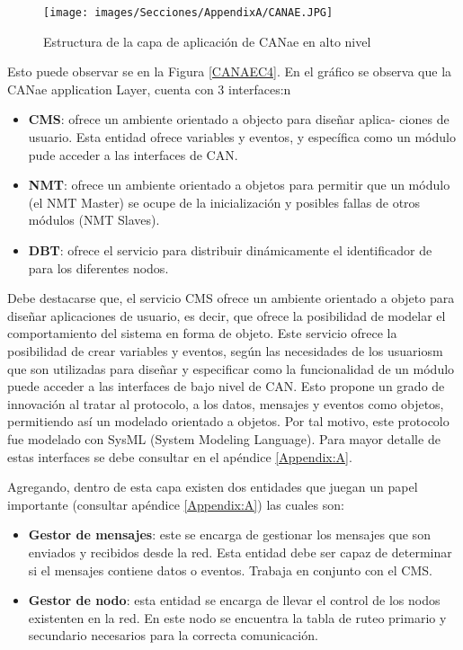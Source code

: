 \begin{figure}[h!]
 \centering
 \texttt{[image: images/Secciones/AppendixA/CANAE.JPG]}
  \caption{Estructura de la capa de aplicación de CANae en alto nivel}
\label{fig:CANAEC4}
\end{figure}

Esto puede observar se en la Figura \ref{CANAEC4}. En el gráfico se observa que
la CANae application Layer, cuenta con 3 interfaces:n
\begin{itemize}
\item \textbf{CMS}: ofrece un ambiente orientado a objecto para diseñar aplica-
ciones de usuario. Esta entidad ofrece variables y eventos, y específica como un módulo pude acceder a
las interfaces de CAN.
\item \textbf{NMT}: ofrece un ambiente orientado a objetos para permitir que un módulo (el
NMT Master) se ocupe de la inicialización y posibles fallas de otros módulos (NMT Slaves).
\item \textbf{DBT}: ofrece el servicio para distribuir dinámicamente el identificador de para los diferentes nodos.
\end{itemize}
Debe destacarse que, el servicio CMS ofrece un ambiente orientado a objeto  para diseñar
aplicaciones de usuario, es decir, que ofrece la posibilidad de modelar el
comportamiento del sistema en forma de objeto. Este servicio ofrece la posibilidad
de crear variables y eventos, según las necesidades de los usuariosm que son
utilizadas para diseñar y especificar como la funcionalidad de un módulo puede
acceder a las interfaces de bajo nivel de CAN. Esto propone un grado de innovación
al tratar al protocolo, a los datos, mensajes y eventos como objetos, permitiendo así
un modelado orientado a objetos. Por tal motivo, este protocolo fue modelado
con SysML (System Modeling Language).
Para mayor detalle de estas interfaces se debe consultar en el apéndice \ref{Appendix:A}.

Agregando, dentro de esta capa existen dos entidades que juegan un papel importante
(consultar apéndice \ref{Appendix:A}) las cuales son:
\begin{itemize}
\item \textbf{Gestor de mensajes}: este se encarga de gestionar los mensajes que son enviados y recibidos desde la red.
Esta entidad debe ser capaz de determinar si el mensajes contiene datos o eventos. Trabaja en conjunto
con el CMS.
\item \textbf{Gestor de nodo}: esta entidad se encarga de llevar el control de los nodos existenten en la red. En este
nodo se encuentra la tabla de ruteo primario y secundario necesarios para la correcta comunicación.
\end{itemize}


